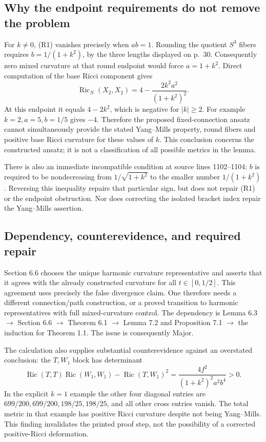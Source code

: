 \documentclass[10pt]{article}
\begin{document}
\subsection*{Why the endpoint requirements do not remove the problem}
For \(k\ne0\), (R1) vanishes precisely when \(ab=1\). Rounding the quotient \(S^3\) fibers requires \(b=1/(1+k^2)\), by the three lengths displayed on p. 30. Consequently zero mixed curvature at that round endpoint would force \(a=1+k^2\). Direct computation of the base Ricci component gives \[\operatorname{Ric}_{N}(X_2,X_2)=4-\frac{2k^2a^2}{(1+k^2)^2}.
 \tag{R2}\] At this endpoint it equals \(4-2k^2\), which is negative for \(|k|\ge2\). For example \(k=2,a=5,b=1/5\) gives \(-4\). Therefore the proposed fixed-connection ansatz cannot simultaneously provide the stated Yang–Mills property, round fibers and positive base Ricci curvature for these values of \(k\). This conclusion concerns the constructed ansatz; it is not a classification of all possible metrics in the lemma.\par
There is also an immediate incompatible condition at source lines 1102–1104: \(b\) is required to be nondecreasing from \(1/\sqrt{1+k^2}\) to the smaller number \(1/(1+k^2)\). Reversing this inequality repairs that particular sign, but does not repair (R1) or the endpoint obstruction. Nor does correcting the isolated bracket index repair the Yang–Mills assertion.\par
\subsection*{Dependency, counterevidence, and required repair}
Section 6.6 chooses the unique harmonic curvature representative and asserts that it agrees with the already constructed curvature for all \(t\in[0,1/2]\). This agreement uses precisely the false divergence claim. One therefore needs a different connection/path construction, or a proved transition to harmonic representatives with full mixed-curvature control. The dependency is Lemma 6.3 \(\to\) Section 6.6 \(\to\) Theorem 6.1 \(\to\) Lemma 7.2 and Proposition 7.1 \(\to\) the induction for Theorem 1.1. The issue is consequently Major.\par
The calculation also supplies substantial counterevidence against an overstated conclusion: the \(T,W_1\) block has determinant \[\operatorname{Ric}(T,T)\operatorname{Ric}(W_1,W_1)-\operatorname{Ric}(T,W_1)^2
   =\frac{4f^2}{(1+k^2)^2a^2b^4}>0.\] In the explicit \(k=1\) example the other four diagonal entries are \(699/200,699/200,198/25,198/25\), and all other cross entries vanish. The total metric in that example has positive Ricci curvature despite not being Yang–Mills. This finding invalidates the printed proof step, not the possibility of a corrected positive-Ricci deformation.\par
\end{document}
